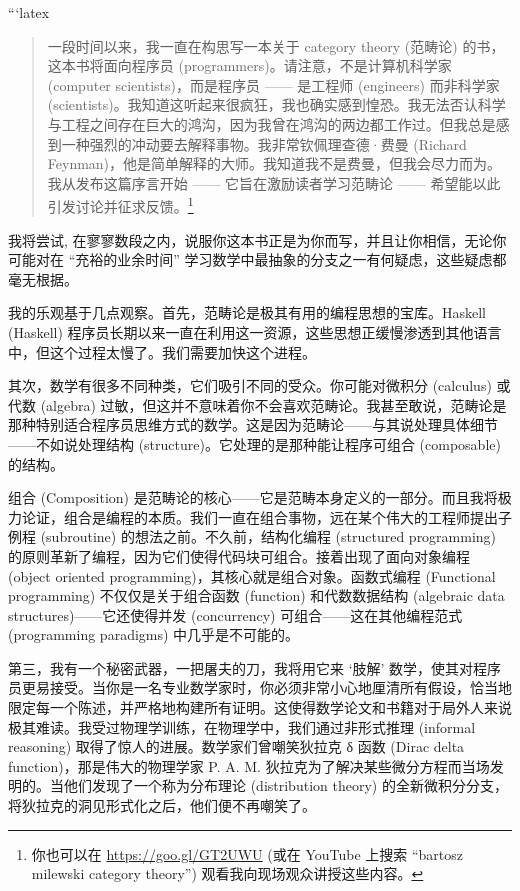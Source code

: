 ```latex

\begin{quote}
  一段时间以来，我一直在构思写一本关于 category theory (范畴论) 的书，这本书将面向程序员 (programmers)。请注意，不是计算机科学家 (computer scientists)，而是程序员 —— 是工程师 (engineers) 而非科学家 (scientists)。我知道这听起来很疯狂，我也确实感到惶恐。我无法否认科学与工程之间存在巨大的鸿沟，因为我曾在鸿沟的两边都工作过。但我总是感到一种强烈的冲动要去解释事物。我非常钦佩理查德·费曼 (Richard Feynman)，他是简单解释的大师。我知道我不是费曼，但我会尽力而为。我从发布这篇序言开始 —— 它旨在激励读者学习范畴论 —— 希望能以此引发讨论并征求反馈。\footnote{
    你也可以在 \href{https://goo.gl/GT2UWU}{https://goo.gl/GT2UWU} (或在 YouTube 上搜索 “bartosz milewski category theory”) 观看我向现场观众讲授这些内容。}
\end{quote}

\lettrine[lhang=0.17]{我}{将尝试}, 在寥寥数段之内，说服你这本书正是为你而写，并且让你相信，无论你可能对在 “充裕的业余时间” 学习数学中最抽象的分支之一有何疑虑，这些疑虑都毫无根据。

我的乐观基于几点观察。首先，范畴论是极其有用的编程思想的宝库。Haskell (Haskell) 程序员长期以来一直在利用这一资源，这些思想正缓慢渗透到其他语言中，但这个过程太慢了。我们需要加快这个进程。

其次，数学有很多不同种类，它们吸引不同的受众。你可能对微积分 (calculus) 或代数 (algebra) 过敏，但这并不意味着你不会喜欢范畴论。我甚至敢说，范畴论是那种特别适合程序员思维方式的数学。这是因为范畴论——与其说处理具体细节——不如说处理结构 (structure)。它处理的是那种能让程序可组合 (composable) 的结构。

组合 (Composition) 是范畴论的核心——它是范畴本身定义的一部分。而且我将极力论证，组合是编程的本质。我们一直在组合事物，远在某个伟大的工程师提出子例程 (subroutine) 的想法之前。不久前，结构化编程 (structured programming) 的原则革新了编程，因为它们使得代码块可组合。接着出现了面向对象编程 (object oriented programming)，其核心就是组合对象。函数式编程 (Functional programming) 不仅仅是关于组合函数 (function) 和代数数据结构 (algebraic data structures)——它还使得并发 (concurrency) 可组合——这在其他编程范式 (programming paradigms) 中几乎是不可能的。

第三，我有一个秘密武器，一把屠夫的刀，我将用它来 ‘肢解’ 数学，使其对程序员更易接受。当你是一名专业数学家时，你必须非常小心地厘清所有假设，恰当地限定每一个陈述，并严格地构建所有证明。这使得数学论文和书籍对于局外人来说极其难读。我受过物理学训练，在物理学中，我们通过非形式推理 (informal reasoning) 取得了惊人的进展。数学家们曾嘲笑狄拉克 δ 函数 (Dirac delta function)，那是伟大的物理学家 P. A. M. 狄拉克为了解决某些微分方程而当场发明的。当他们发现了一个称为分布理论 (distribution theory) 的全新微积分分支，将狄拉克的洞见形式化之后，他们便不再嘲笑了。

